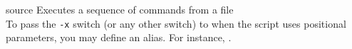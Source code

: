 \begin{nusmvCommand} {source} {Executes a sequence of commands from a file}
 \\
  To pass the \texttt{-x} switch (or any other switch) to  when the
  script uses positional parameters, you may define an alias. For
  instance, .
\end{nusmvCommand}
